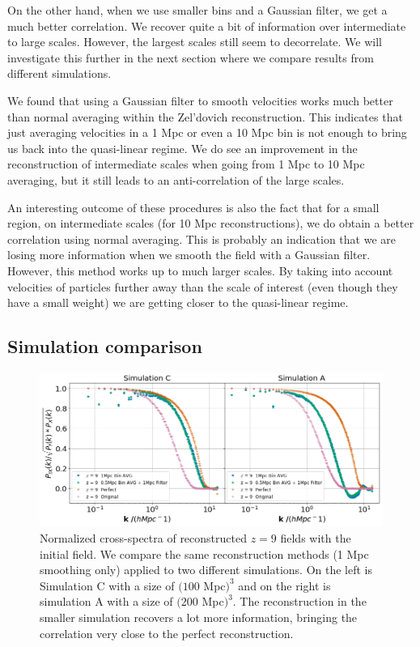 On the other hand, when we use smaller bins and a Gaussian filter, we get a much better correlation. We recover quite a bit of information over intermediate to large scales. However, the largest scales still seem to decorrelate. We will investigate this further in the next section where we compare results from different simulations. 

We found that using a Gaussian filter to smooth velocities works much better than normal averaging within the Zel'dovich reconstruction. This indicates that just averaging velocities in a 1 Mpc or even a 10 Mpc bin is not enough to bring us back into the quasi-linear regime. We do see an improvement in the reconstruction of intermediate scales when going from 1 Mpc to 10 Mpc averaging, but it still leads to an anti-correlation of the large scales.

An interesting outcome of these procedures is also the fact that for a small region, on intermediate scales (for 10 Mpc reconstructions), we do obtain a better correlation using normal averaging. This is probably an indication that we are losing more information when we smooth the field with a Gaussian filter. However, this method works up to much larger scales. By taking into account velocities of particles further away than the scale of interest (even though they have a small weight) we are getting closer to the quasi-linear regime. 

\subsection{Simulation comparison}

\begin{figure}
    \centering
    \includegraphics[width=1\columnwidth]{images/realRecon/z9SimComp.png}%
    
    \caption{
        Normalized cross-spectra of reconstructed $z=9$ fields with the initial field. We compare the same reconstruction methods (1 Mpc smoothing only) applied to two different simulations. On the left is Simulation C with a size of $(100$ Mpc$)^3$ and on the right is simulation A with a size of $(200$ Mpc$)^3$. The reconstruction in the smaller simulation recovers a lot more information, bringing the correlation very close to the perfect reconstruction.
        }
        
        \label{fig:4.4}
    \end{figure}
    
